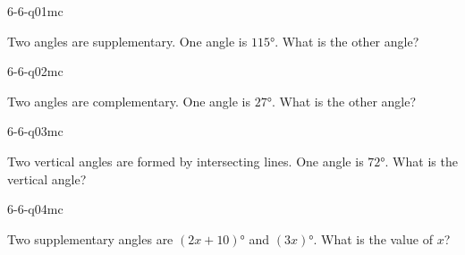 

\begin{practiceQuestion}{6-6-q01}{mc}
\begin{questionText}
Two angles are supplementary. One angle is $115°$. What is the other angle?
\end{questionText}
\end{practiceQuestion}

\begin{practiceQuestion}{6-6-q02}{mc}
\begin{questionText}
Two angles are complementary. One angle is $27°$. What is the other angle?
\end{questionText}
\end{practiceQuestion}

\begin{practiceQuestion}{6-6-q03}{mc}
\begin{questionText}
Two vertical angles are formed by intersecting lines. One angle is $72°$. What is the vertical angle?
\end{questionText}
\end{practiceQuestion}

\begin{practiceQuestion}{6-6-q04}{mc}
\begin{questionText}
Two supplementary angles are $(2x + 10)°$ and $(3x)°$. What is the value of $x$?
\end{questionText}
\end{practiceQuestion}

